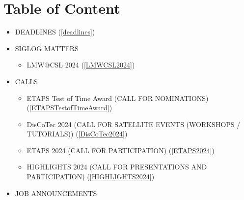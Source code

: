 \documentclass[prodmode,acmtecs]{acmsmall} %
\begin{document}
\section{Table of Content}\begin{itemize}\item DEADLINES (\cref{deadlines}) 
 
\item SIGLOG MATTERS 
 
\begin{itemize}\item LMW@CSL 2024 (\cref{LMWCSL2024})
\end{itemize} 
\item CALLS 
 
\begin{itemize}\item ETAPS Test of Time Award (CALL FOR NOMINATIONS) (\cref{ETAPSTestofTimeAward})
\item DisCoTec 2024 (CALL FOR SATELLITE EVENTS (WORKSHOPS / TUTORIALS)) (\cref{DisCoTec2024})
\item ETAPS 2024 (CALL FOR PARTICIPATION) (\cref{ETAPS2024})
\item HIGHLIGHTS 2024 (CALL FOR PRESENTATIONS AND PARTICIPATION) (\cref{HIGHLIGHTS2024})
\end{itemize} 
\item JOB ANNOUNCEMENTS 
 

\end{itemize}
\end{document}
